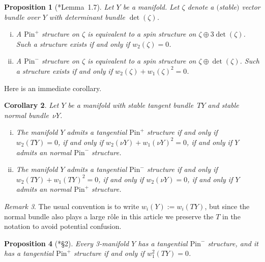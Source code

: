 \documentclass[a4paper, reqno]{amsart}
\newtheorem{proposition}{Proposition}[section]
\newtheorem{corollary}[proposition]{Corollary}
\theoremstyle{definition}
\theoremstyle{remark}
\newtheorem{remark}[proposition]{Remark}
\newcommand{\pinplus}{{\mathrm{Pin}^+}\!}
\newcommand{\pinminus}{{\mathrm{Pin}^-}}
\begin{document}
\begin{proposition}[{\cite{kirby-taylor:pin}*{Lemma~1.7}}]Let $Y$ be a manifold. Let $\zeta$ denote a $($stable$)$ vector bundle over $Y$ with determinant bundle $\det(\zeta)$. 

\begin{enumerate}[(i)]
\item A $\pinplus$ structure on $\zeta$ is equivalent to a spin structure on $\zeta \oplus 3\det(\zeta)$. Such a structure exists if and only if $w_2(\zeta)=0$.  

\item A $\pinminus$ structure on $\zeta$ is equivalent to a spin structure on $\zeta \oplus \det(\zeta)$.  Such a structure exists if and only if $w_2(\zeta) + w_1(\zeta)^2=0$. 
\end{enumerate}
\end{proposition}

Here is an immediate corollary.

\begin{corollary}\label{cor:equiv-pinplus-minus}
Let $Y$ be a manifold with stable tangent bundle~$TY$ and stable normal bundle~$\nu Y$. 
\begin{enumerate}[(i)]
    \item\label{item:cor-equiv-pinplus-minus-i} The manifold $Y$ admits a tangential $\pinplus$ structure if and only if $w_2(TY)=0$, if and only if $w_2(\nu Y) + w_1(\nu Y)^2=0$, if and only if $Y$ admits an normal $\pinminus$ structure.  
\item\label{item:cor-equiv-pinplus-minus-ii} The manifold $Y$ admits a tangential $\pinminus$ structure if and only if $w_2(TY)+ w_1(TY)^2=0$, if and only if $w_2(\nu Y)=0$, if and only if $Y$ admits an normal $\pinplus$ structure. 
\end{enumerate}
\end{corollary}

\begin{remark}
    The usual convention is to write $w_i(Y):=w_i(TY)$, but since the normal bundle also plays a large r\^{o}le in this article we preserve the $T$ in the notation to avoid potential confusion. 
\end{remark}

\begin{proposition}[{\cite{kirby-taylor:pin}*{\S 2}}]\label{lemma-existence-of-pin-plus-structure}
Every 3-manifold $Y$ has a tangential $\pinminus$ structure, and it has a tangential $\pinplus$ structure if and only if $w_1^2(TY)=0$. 
\end{proposition}
\end{document}
